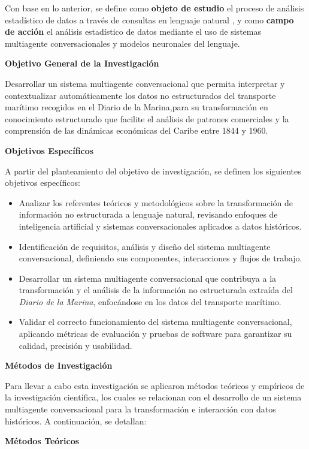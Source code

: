 Con base en lo anterior, se define como \textbf{objeto de estudio} el proceso de análisis estadístico de datos a través de consultas en lenguaje natural , y como \textbf{campo de acción} el análisis estadístico de datos mediante el uso de sistemas multiagente conversacionales y modelos neuronales del lenguaje.

\textbf{Objetivo General de la Investigación}

Desarrollar un sistema multiagente conversacional que permita interpretar y contextualizar automáticamente los datos no estructurados del transporte marítimo recogidos en el Diario de la Marina,para su transformación en conocimiento estructurado que facilite el análisis de patrones comerciales y la comprensión de las dinámicas económicas del Caribe entre 1844 y 1960.

\textbf{Objetivos Específicos}

A partir del planteamiento del objetivo de investigación, se definen los siguientes objetivos específicos:

\begin{itemize}
	\item Analizar los referentes teóricos y metodológicos sobre la transformación de información no estructurada a lenguaje natural, revisando enfoques de inteligencia artificial y sistemas conversacionales aplicados a datos históricos.
	\item Identificación de requisitos, análisis y diseño del sistema multiagente conversacional, definiendo sus componentes, interacciones y flujos de trabajo.
	\item Desarrollar un sistema multiagente conversacional que contribuya a la transformación y el análisis de la información no estructurada extraída del \textit{Diario de la Marina}, enfocándose en los datos del transporte marítimo.
	\item Validar el correcto funcionamiento del sistema multiagente conversacional, aplicando métricas de evaluación y pruebas de software para garantizar su calidad, precisión y usabilidad.
\end{itemize}

\textbf{Métodos de Investigación}

Para llevar a cabo esta investigación se aplicaron métodos teóricos y empíricos de la investigación científica, los cuales se relacionan con el desarrollo de un sistema multiagente conversacional para la transformación e interacción con datos históricos. A continuación, se detallan:

\textbf{Métodos Teóricos}

